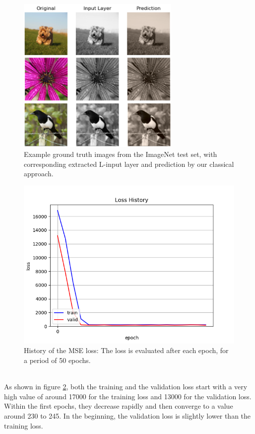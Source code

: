 \documentclass[12pt,letterpaper]{article}
\begin{document}
\begin{figure}[htb]
	\centering
	\includegraphics[width=0.7\textwidth]{class_predict.png}
	\caption{Example ground truth images from the ImageNet test set, with corresponding extracted L-input layer and prediction by our classical approach.}
	\label{classical}
\end{figure}\begin{figure}
	\centering
	\includegraphics[width=.6\textwidth]{loss_classical.png}
	\caption{History of the MSE loss: The loss is evaluated after each epoch, for a period of 50 epochs.}
	\label{loss_class}
\end{figure}
\vspace{0.5cm}
\hspace{2cm}\\
As shown in figure \ref{loss_class},  both the training and the validation loss start with a very high value of around 17000 for the training loss and 13000 for the validation loss. Within the first epochs, they decrease rapidly and then converge to a value around 230 to 245. In the beginning, the validation loss is slightly lower than the training loss.\\
\end{document}
